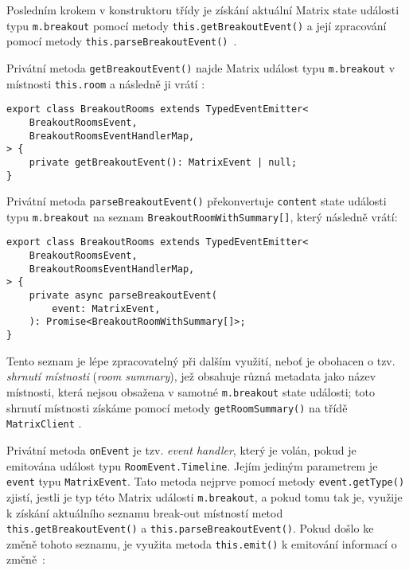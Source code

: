 Posledním krokem v konstruktoru třídy
je získání aktuální Matrix state události typu \texttt{m.breakout}
pomocí metody \texttt{this.getBreakoutEvent()} a její zpracování
pomocí metody
\texttt{this.parseBreakoutEvent()}~\parencite{GitHub-MatrixJSSDK-BreakoutRooms}.

Privátní metoda \texttt{getBreakoutEvent()} najde Matrix událost
typu \texttt{m.breakout} v místnosti
\texttt{this.room} a následně ji vrátí
\parencite{GitHub-MatrixJSSDK-BreakoutRooms}:

\begin{verbatim}
export class BreakoutRooms extends TypedEventEmitter<
	BreakoutRoomsEvent,
	BreakoutRoomsEventHandlerMap,
> {
	private getBreakoutEvent(): MatrixEvent | null;
}
\end{verbatim}

Privátní metoda \texttt{parseBreakoutEvent()} překonvertuje
\texttt{content} state události typu \texttt{m.breakout} na
seznam \texttt{BreakoutRoomWithSummary[]}, který následně vrátí:

\begin{verbatim}
export class BreakoutRooms extends TypedEventEmitter<
	BreakoutRoomsEvent,
	BreakoutRoomsEventHandlerMap,
> {
	private async parseBreakoutEvent(
		event: MatrixEvent,
	): Promise<BreakoutRoomWithSummary[]>;
}
\end{verbatim}

Tento seznam je lépe zpracovatelný při dalším využití, neboť je obohacen o tzv.
\textit{shrnutí místnosti} (\textit{room summary}), jež obsahuje různá metadata
jako název místnosti, která nejsou obsažena v samotné
\texttt{m.breakout} state události; toto shrnutí místnosti získáme
pomocí metody \texttt{getRoomSummary()} na třídě
\texttt{MatrixClient}
\parencite{GitHub-MatrixJSSDK-BreakoutRooms}.

Privátní metoda \texttt{onEvent} je tzv. \textit{event handler},
který je volán, pokud je emitována událost typu
\texttt{RoomEvent.Timeline}. Jejím jediným parametrem je
\texttt{event} typu \texttt{MatrixEvent}. Tato
metoda nejprve pomocí metody \texttt{event.getType()} zjistí,
jestli je typ této Matrix události \texttt{m.breakout}, a pokud tomu
tak je, využije k získání aktuálního seznamu break-out místností metod
\texttt{this.getBreakoutEvent()} a
\texttt{this.parseBreakoutEvent()}. Pokud došlo ke změně tohoto
seznamu, je využita metoda \texttt{this.emit()} k emitování
informací o změně~\parencite{GitHub-MatrixJSSDK-BreakoutRooms}:


